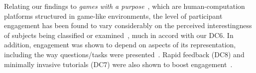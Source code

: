 \documentclass{sigchi}
\begin{document}
\begin{spacing}{0.97}

Relating our findings to \emph{games with a purpose}~\cite{vonahn2008}, which are human-computation platforms structured in game-like environments, the level of participant engagement has been found to vary considerably on the perceived interestingness of subjects being classified or examined~\cite{thaler2012}, much in accord with our DC6.  In addition, engagement was shown to depend on aspects of its representation, including the way questions/tasks were presented~\cite{inputagreement}. Rapid feedback (DC8) and minimally invasive tutorials (DC7) were also shown to boost engagement~\cite{zichermann2011gamification}.

%
%
%
%



\end{spacing}
\end{document}
